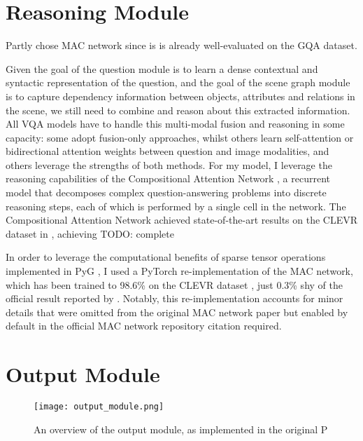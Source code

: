 
\section{Reasoning Module}
\label{section:reasoning_module}

{\color{red}Partly chose MAC network since is is already well-evaluated on the GQA dataset.}

Given the goal of the question module is to learn a dense contextual and syntactic representation of the question, and the goal of the scene graph module is to capture dependency information between objects, attributes and relations in the scene, we still need to combine and reason about this extracted information. All VQA models have to handle this multi-modal fusion and reasoning in some capacity: some adopt fusion-only approaches, whilst others learn self-attention or bidirectional attention weights between question and image modalities, and others leverage the strengths of both methods. For my model, I leverage the reasoning capabilities of the Compositional Attention Network \citeauthor{hudson2018compositional}, a recurrent model that decomposes complex question-answering problems into discrete reasoning steps, each of which is performed by a single cell in the network. The Compositional Attention Network achieved state-of-the-art results on the CLEVR dataset in \citeyear{hudson2018compositional}, achieving {\color{red} TODO: complete}

In order to leverage the computational benefits of sparse tensor operations implemented in PyG \cite{fey2019fast}, I used a PyTorch \cite{paszke2019pytorch} re-implementation of the MAC network, which has been trained to 98.6\% on the CLEVR dataset \cite{eyzaguirre2020differentiable}, just 0.3\% shy of the official result reported by 
\citeauthor{hudson2018compositional}. Notably, this re-implementation accounts for minor details that were omitted from the original MAC network paper but enabled by default in the official MAC network repository {\color{red} citation required}.



\section{Output Module}
\label{section:output_module}

\begin{figure}[htbp]
    \centering
    \texttt{[image: output\_module.png]}
    \caption{An overview of the output module, as implemented in the original P}
    \label{fig:output_module}
\end{figure}

